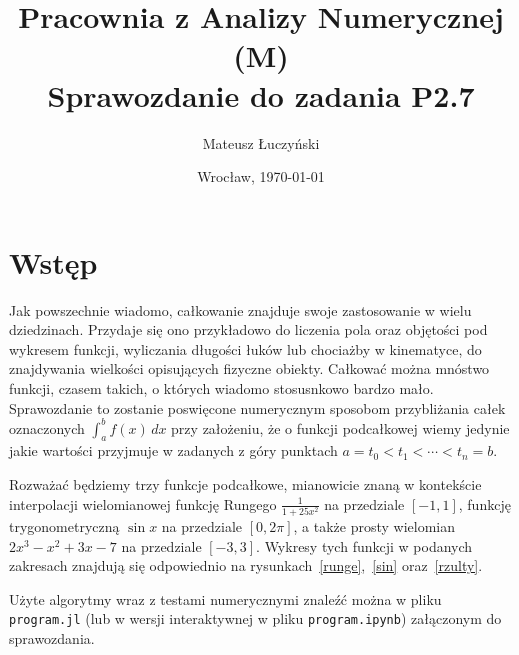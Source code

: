 \documentclass[11pt,wide,leqno]{article}
\title{\textbf{Pracownia z Analizy Numerycznej (M)} \\
        Sprawozdanie do zadania \textbf{P2.7} \\}
\date{Wrocław, \today}
\author{Mateusz Łuczyński}
\begin{document}
    \maketitle
    \thispagestyle{empty}
    \section{Wstęp}
        Jak powszechnie wiadomo, całkowanie znajduje swoje zastosowanie w wielu dziedzinach.
        Przydaje się ono przykładowo do liczenia pola oraz objętości pod wykresem funkcji, wyliczania długości łuków lub
        chociażby w kinematyce, do znajdywania wielkości opisujących fizyczne obiekty.
        Całkować można mnóstwo funkcji, czasem takich, o których wiadomo stosusnkowo bardzo mało.
        Sprawozdanie to zostanie poswięcone numerycznym sposobom przybliżania całek oznaczonych \(\int_{a}^{b} f(x)\,dx\)
        przy założeniu, że o funkcji podcałkowej wiemy jedynie jakie wartości przyjmuje
        w zadanych z góry punktach \(a = t_0 < t_1 < \cdots < t_n = b\).

        Rozważać będziemy trzy funkcje podcałkowe, mianowicie znaną w kontekście interpolacji wielomianowej
        funkcję Rungego \(\frac{1}{1 + 25x^2}\) na przedziale \(\left[-1,1\right]\), funkcję trygonometryczną \(\sin x\) na przedziale \(\left[0,2\pi\right]\), a także
        prosty wielomian \(2x^3 - x^2 + 3x - 7\) na przedziale \(\left[-3,3\right]\). Wykresy tych funkcji w podanych zakresach
        znajdują się odpowiednio na rysunkach~\ref{runge},~\ref{sin} oraz~\ref{rzulty}.

        Użyte algorytmy wraz z testami numerycznymi znaleźć można w pliku \texttt{program.jl} 
        (lub w wersji interaktywnej w pliku \texttt{program.ipynb}) załączonym do 
        sprawozdania. 
        
\end{document}
